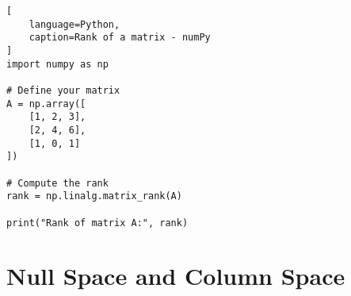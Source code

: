 \begin{lstlisting}[
    language=Python,
    caption=Rank of a matrix - numPy
]
import numpy as np

# Define your matrix
A = np.array([
    [1, 2, 3],
    [2, 4, 6],
    [1, 0, 1]
])

# Compute the rank
rank = np.linalg.matrix_rank(A)

print("Rank of matrix A:", rank)
\end{lstlisting}









\section{Null Space and Column Space}

